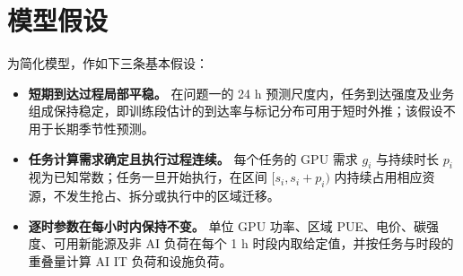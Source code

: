 \section{模型假设}

为简化模型，作如下三条基本假设：

\begin{itemize}[label=\textbullet,leftmargin=3em,labelsep=0.75em,itemsep=0.4ex,topsep=0.35ex]
\item \textbf{短期到达过程局部平稳。} 在问题一的 24 h 预测尺度内，任务到达强度及业务组成保持稳定，即训练段估计的到达率与标记分布可用于短时外推；该假设不用于长期季节性预测。

\item \textbf{任务计算需求确定且执行过程连续。} 每个任务的 GPU 需求 $g_i$ 与持续时长 $p_i$ 视为已知常数；任务一旦开始执行，在区间 $[s_i,s_i+p_i)$ 内持续占用相应资源，不发生抢占、拆分或执行中的区域迁移。

\item \textbf{逐时参数在每小时内保持不变。} 单位 GPU 功率、区域 PUE、电价、碳强度、可用新能源及非 AI 负荷在每个 1 h 时段内取给定值，并按任务与时段的重叠量计算 AI IT 负荷和设施负荷。

\end{itemize}
